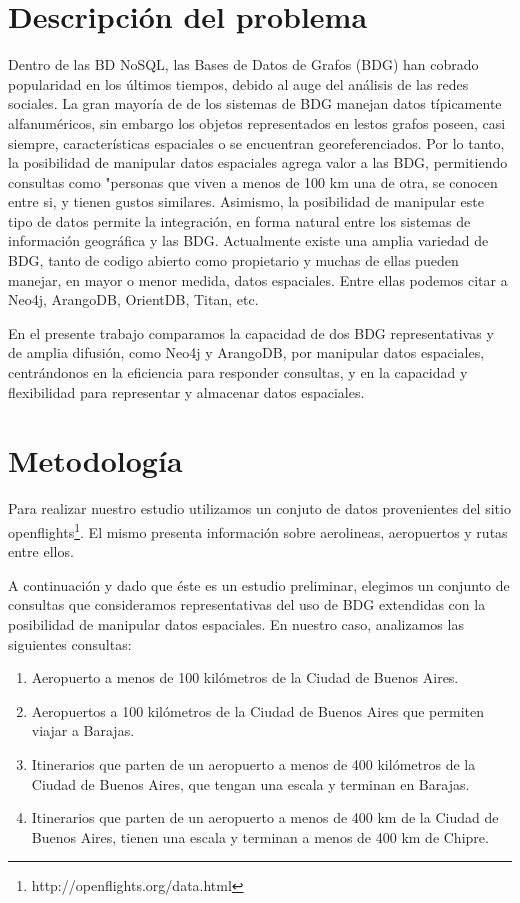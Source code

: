 \documentclass{llncs}
\begin{document}
\section{Descripción del problema}
\vspace{-0.5em}
Dentro de las BD NoSQL, las Bases de Datos de Grafos (BDG) han cobrado popularidad en los últimos tiempos, debido al auge del análisis de las redes sociales.
La gran mayoría de de los sistemas de BDG manejan datos típicamente alfanuméricos, sin embargo los objetos representados en lestos grafos poseen, casi siempre, características espaciales o se encuentran georeferenciados.
Por lo tanto, la posibilidad de manipular datos espaciales agrega valor a las BDG, permitiendo consultas como "personas que viven a menos de 100 km una de otra, se conocen entre si, y tienen gustos similares.
Asimismo, la posibilidad de manipular este tipo de datos permite la integración, en forma natural entre los sistemas de información geográfica y las BDG.
Actualmente existe una amplia variedad de BDG, tanto de codigo abierto como propietario y muchas de ellas pueden manejar, en mayor o menor medida, datos espaciales. Entre ellas podemos citar a Neo4j\cite{n4jsp}, ArangoDB\cite{adbgi}, OrientDB, Titan, etc.

En el presente trabajo comparamos la capacidad de dos BDG representativas y de amplia difusión, como Neo4j y ArangoDB, por manipular datos espaciales, centrándonos en la eficiencia para responder consultas, y en la capacidad y flexibilidad para representar y almacenar datos espaciales.

\section{Metodología}
\vspace{-0.5em}
Para realizar nuestro estudio utilizamos un conjuto de datos provenientes del sitio  openflights\footnote{http://openflights.org/data.html}. El mismo presenta información sobre aerolineas, aeropuertos y rutas entre ellos.

A continuación y dado que éste es un estudio preliminar, elegimos un conjunto de consultas que consideramos representativas del uso de BDG extendidas con la posibilidad de manipular datos espaciales. En nuestro caso, analizamos las siguientes consultas:
\vspace{-0.5em}
\begin{enumerate}
\itemsep0em 
\item Aeropuerto a menos de 100 kilómetros de la Ciudad de Buenos Aires.
\item Aeropuertos a 100 kilómetros de la Ciudad de Buenos Aires que permiten viajar a Barajas.
\item Itinerarios que parten de un aeropuerto a menos de 400 kilómetros de la Ciudad de Buenos Aires, que tengan una escala y terminan en Barajas.
\item Itinerarios que parten de un aeropuerto a menos de 400 km de la Ciudad de Buenos Aires, tienen una escala y terminan a menos de 400 km de Chipre.
\end{enumerate}
\end{document}
